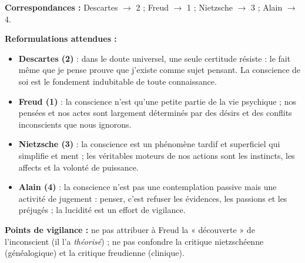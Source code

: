 \documentclass[11pt]{article}
\begin{document}
\begin{corrige}
\textbf{Correspondances :} Descartes $\to$ 2 ; Freud $\to$ 1 ; Nietzsche $\to$ 3 ; Alain $\to$ 4.

\textbf{Reformulations attendues :}
\begin{itemize}
\item \textbf{Descartes (2)} : dans le doute universel, une seule certitude résiste : le fait même que je pense prouve que j'existe comme sujet pensant. La conscience de soi est le fondement indubitable de toute connaissance.
\item \textbf{Freud (1)} : la conscience n'est qu'une petite partie de la vie psychique ; nos pensées et nos actes sont largement déterminés par des désirs et des conflits inconscients que nous ignorons.
\item \textbf{Nietzsche (3)} : la conscience est un phénomène tardif et superficiel qui simplifie et ment ; les véritables moteurs de nos actions sont les instincts, les affects et la volonté de puissance.
\item \textbf{Alain (4)} : la conscience n'est pas une contemplation passive mais une activité de jugement : penser, c'est refuser les évidences, les passions et les préjugés ; la lucidité est un effort de vigilance.
\end{itemize}
\textbf{Points de vigilance :} ne pas attribuer à Freud la « découverte » de l'inconscient (il l'a \emph{théorisé}) ; ne pas confondre la critique nietzschéenne (généalogique) et la critique freudienne (clinique).
\end{corrige}
\end{document}
